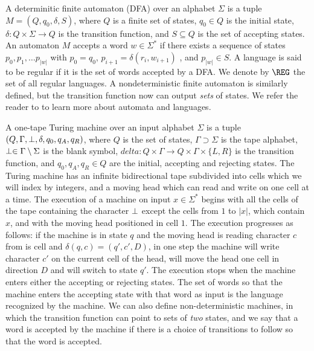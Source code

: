 A determinitic finite automaton (DFA) over an alphabet $\Sigma$ is a tuple $M = (Q, q_0, \delta, S)$, 
where $Q$ is a finite set of states, $q_0 \in Q$ is the initial state, 
$\delta \colon Q \times \Sigma \to Q$ is the transition function, and $S \subseteq Q$ is the 
set of accepting states. An automaton $M$ accepts a word $w \in \Sigma^*$ if there exists a sequence
of states $p_0, p_1, \ldots p_{|w|}$ with $p_0 = q_0$, $p_{i+1} = \delta(r_i, w_{i+1})$ , and 
$p_{|w|} \in S$. A language is said to be regular if it is the set of words accepted by a 
DFA. We denote by $\REG$ the set of all regular languages.
A nondeterministic finite automaton is similarly defined, but the transition function now 
can output \emph{sets} of states. We refer the reader to \cite{HopcroftUllman} to learn more about
automata and languages. 

A one-tape Turing machine over an input alphabet $\Sigma$ is a tuple $(Q, \Gamma, \perp, 
\delta, q_0, q_A, q_R)$, where $Q$ is the set of states, $\Gamma \supset \Sigma$ is the tape alphabet,
$\perp \in \Gamma \setminus \Sigma$ is the blank symbol, 
$delta \colon Q \times \Gamma \to Q \times \Gamma \times \{L, R\}$ is the transition function, and
$q_0, q_A, q_R \in Q$ are the initial, accepting and rejecting states. The Turing machine 
has an infinite bidirectional tape subdivided into cells which we will index by integers, 
and a moving head which can read and write on one cell at a time. 
The execution of a machine on input $x \in \Sigma^*$ begins with all the 
cells of the tape containing the character $\perp$ except the cells from
$1$ to $|x|$, which contain $x$, and with the moving head positioned in cell $1$.
The execution progresses as follows: if the machine is in state $q$ and the 
moving head is reading character $c$ from is cell and $\delta(q, c) = (q', c', D)$,
in one step the machine will write character $c'$ on the current cell of the head,
will move the head one cell in direction $D$ and will switch to state $q'$. 
The execution stops when the machine enters either the accepting or rejecting 
states. The set of words so that the machine enters the accepting state with that 
word as input is the language recognized by the machine. We can also define non-deterministic
machines, in which the transition function can point to sets of \emph{two} states, and 
we say that a word is accepted by the machine if there is a choice of transitions to follow
so that the word is accepted. 


